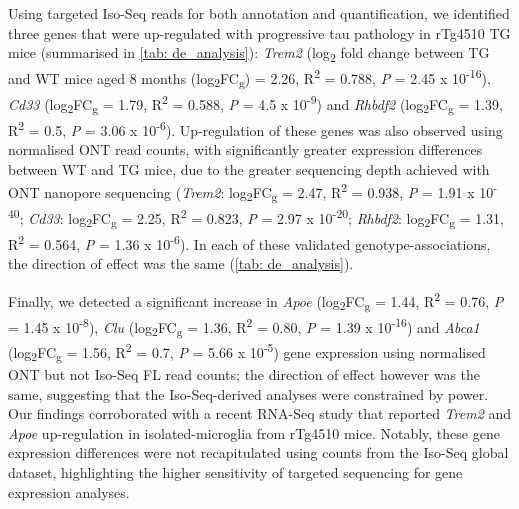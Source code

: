 Using targeted Iso-Seq reads for both annotation and quantification, we identified three genes that were up-regulated with progressive tau pathology in rTg4510 TG mice (summarised in \cref{tab: de_analysis}): \textit{Trem2} (log\textsubscript{2} fold change between TG and WT mice aged 8 months (log\textsubscript{2}FC\textsubscript{g}) = 2.26, R\textsuperscript{2} = 0.788, \textit{P} = 2.45 x 10\textsuperscript{-16}), \textit{Cd33} (log\textsubscript{2}FC\textsubscript{g} = 1.79, R\textsuperscript{2} = 0.588, \textit{P} = 4.5 x 10\textsuperscript{-9}) and \textit{Rhbdf2} (log\textsubscript{2}FC\textsubscript{g} = 1.39, R\textsuperscript{2} = 0.5, \textit{P} = 3.06 x 10\textsuperscript{-6}). Up-regulation of these genes was also observed using normalised ONT read counts, with significantly greater expression differences between WT and TG mice, due to the greater sequencing depth achieved with ONT nanopore sequencing (\textit{Trem2}: log\textsubscript{2}FC\textsubscript{g} = 2.47, R\textsuperscript{2} = 0.938, \textit{P} = 1.91 x 10\textsuperscript{-40}; \textit{Cd33}: log\textsubscript{2}FC\textsubscript{g} = 2.25, R\textsuperscript{2} = 0.823, \textit{P} = 2.97 x 10\textsuperscript{-20}; \textit{Rhbdf2}: log\textsubscript{2}FC\textsubscript{g} = 1.31,  R\textsuperscript{2} = 0.564, \textit{P} = 1.36 x 10\textsuperscript{-6}). In each of these validated genotype-associations, the direction of effect was the same (\cref{tab: de_analysis}). 

Finally, we detected a significant increase in \textit{Apoe} (log\textsubscript{2}FC\textsubscript{g} = 1.44, R\textsuperscript{2} = 0.76, \textit{P} = 1.45 x 10\textsuperscript{-8}), \textit{Clu} (log\textsubscript{2}FC\textsubscript{g} = 1.36, R\textsuperscript{2} = 0.80, \textit{P} = 1.39 x 10\textsuperscript{-16}) and \textit{Abca1} (log\textsubscript{2}FC\textsubscript{g} = 1.56, R\textsuperscript{2} = 0.7, \textit{P} = 5.66 x 10\textsuperscript{-5}) gene expression using normalised ONT but not Iso-Seq FL read counts; the direction of effect however was the same, suggesting that the Iso-Seq-derived analyses were constrained by power. Our findings corroborated with a recent RNA-Seq study that reported \textit{Trem2} and \textit{Apoe} up-regulation in isolated-microglia from rTg4510 mice\cite{Sobue2021}. Notably, these gene expression differences were not recapitulated using counts from the Iso-Seq global dataset, highlighting the higher sensitivity of targeted sequencing for gene expression analyses. 

